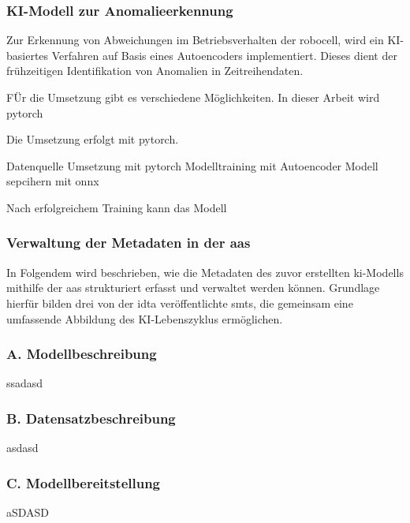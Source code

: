 \subsubsection{KI-Modell zur Anomalieerkennung}
Zur Erkennung von Abweichungen im Betriebsverhalten der robocell, wird ein KI-basiertes Verfahren auf Basis eines Autoencoders implementiert.
Dieses dient der frühzeitigen Identifikation von Anomalien in Zeitreihendaten.


FÜr die Umsetzung gibt es verschiedene Möglichkeiten. In dieser Arbeit wird pytorch 




Die Umsetzung erfolgt mit pytorch.




Datenquelle
Umsetzung mit pytorch
Modelltraining mit Autoencoder
Modell sepcihern mit onnx

Nach erfolgreichem Training kann das Modell 

\subsubsection{Verwaltung der Metadaten in der \acs{aas}}
In Folgendem wird beschrieben, wie die Metadaten des zuvor erstellten \acs{ki}-Modells mithilfe der \acs{aas} strukturiert erfasst und verwaltet werden können. 
Grundlage hierfür bilden drei von der \acs{idta} veröffentlichte \acsp{smt}, die gemeinsam eine umfassende Abbildung des KI-Lebenszyklus ermöglichen.

\subsubsection*{A. Modellbeschreibung}
ssadasd
\subsubsection*{B. Datensatzbeschreibung}
asdasd
\subsubsection*{C. Modellbereitstellung}
aSDASD